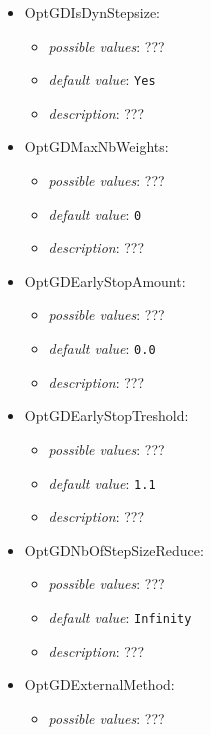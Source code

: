 \documentclass{article}
\begin{document}
\begin{itemize}
    \item OptGDIsDynStepsize:
           \begin{itemize}
                \item \emph{possible values}: ???
                \item \emph{default value}: \texttt{Yes}
                \item \emph{description}: ???
           \end{itemize}
    \item OptGDMaxNbWeights:
           \begin{itemize}
                \item \emph{possible values}: ???
                \item \emph{default value}: \texttt{0}
                \item \emph{description}: ???
           \end{itemize}
    \item OptGDEarlyStopAmount:
           \begin{itemize}
                \item \emph{possible values}: ???
                \item \emph{default value}: \texttt{0.0}
                \item \emph{description}: ???
           \end{itemize}
    \item OptGDEarlyStopTreshold:
           \begin{itemize}
                \item \emph{possible values}: ???
                \item \emph{default value}: \texttt{1.1}
                \item \emph{description}: ???
           \end{itemize}
    \item OptGDNbOfStepSizeReduce:
           \begin{itemize}
                \item \emph{possible values}: ???
                \item \emph{default value}: \texttt{Infinity}
                \item \emph{description}: ???
           \end{itemize}
    \item OptGDExternalMethod:
           \begin{itemize}
                \item \emph{possible values}: ???

\end{itemize}
\end{itemize}
\end{document}

